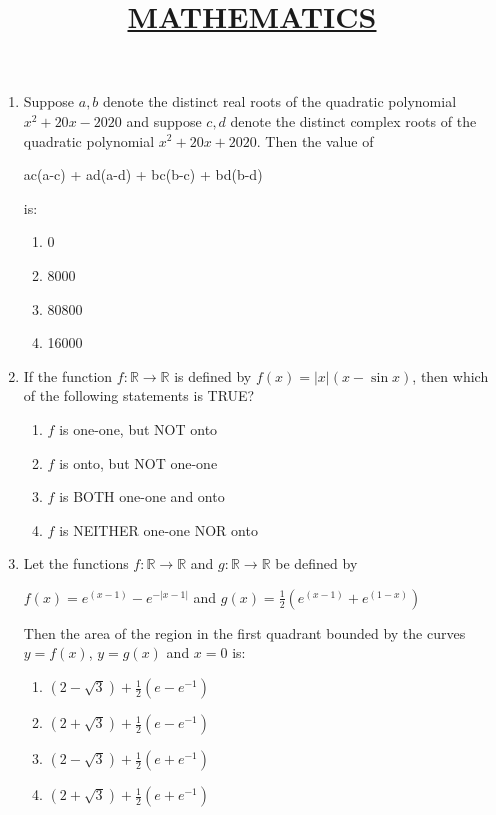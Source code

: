\documentclass{article}
\title{\underline{\textbf{MATHEMATICS}}}
\date{}
\begin{document}
\maketitle
\begin{enumerate}
    
\item  Suppose $a, b$ denote the distinct real roots of the quadratic polynomial $x^2+20x-2020$ and suppose $c, d$ denote the distinct complex roots of the quadratic polynomial $x^2+20x+2020$. Then the value of

\begin{center}
     ac(a-c) + ad(a-d) + bc(b-c) + bd(b-d)
\end{center}

    is:
    
    \begin{enumerate}
        \item  0
        \item  8000
        \item  80800
        \item  16000
    \end{enumerate}

\item  If the function $f: \mathbb{R} \to \mathbb{R}$ is defined by $f(x)=|x|(x-\sin x)$, then which of the following statements is TRUE?

    \begin{enumerate}
        \item  $f$ is one-one, but NOT onto
        \item  $f$ is onto, but NOT one-one
        \item  $f$ is BOTH one-one and onto
        \item  $f$ is NEITHER one-one NOR onto
    \end{enumerate}

\item  Let the functions $f: \mathbb{R} \to \mathbb{R}$ and $g: \mathbb{R} \to \mathbb{R}$ be defined by 

$f(x) = e^{(x - 1)} - e^{- |x - 1|}$ and $ g(x) = \frac{1}{2} \left(e^{(x - 1)} + e^{(1 - x)}\right)$

    Then the area of the region in the first quadrant bounded by the curves $y = f(x)$, $y = g(x)$ and $x = 0$ is:

    \begin{enumerate}
        \item  $(2 - \sqrt{3}) + \frac{1}{2} (e - e^{-1})$
        \item  $(2 + \sqrt{3}) + \frac{1}{2} (e - e^{-1})$
        \item  $(2 - \sqrt{3}) + \frac{1}{2} (e + e^{-1})$
        \item  $(2 + \sqrt{3}) + \frac{1}{2} (e + e^{-1})$
    \end{enumerate}


\end{enumerate}
\end{document}
